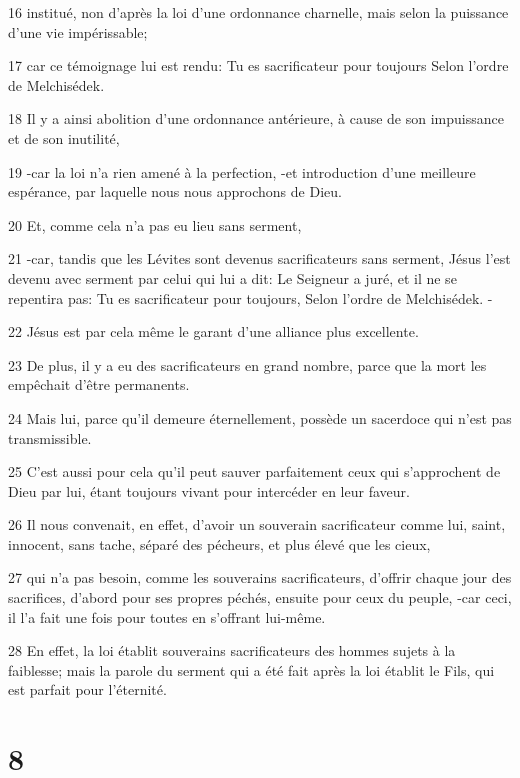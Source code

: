 \par 16 institué, non d'après la loi d'une ordonnance charnelle, mais selon la puissance d'une vie impérissable;
\par 17 car ce témoignage lui est rendu: Tu es sacrificateur pour toujours Selon l'ordre de Melchisédek.
\par 18 Il y a ainsi abolition d'une ordonnance antérieure, à cause de son impuissance et de son inutilité,
\par 19 -car la loi n'a rien amené à la perfection, -et introduction d'une meilleure espérance, par laquelle nous nous approchons de Dieu.
\par 20 Et, comme cela n'a pas eu lieu sans serment,
\par 21 -car, tandis que les Lévites sont devenus sacrificateurs sans serment, Jésus l'est devenu avec serment par celui qui lui a dit: Le Seigneur a juré, et il ne se repentira pas: Tu es sacrificateur pour toujours, Selon l'ordre de Melchisédek. -
\par 22 Jésus est par cela même le garant d'une alliance plus excellente.
\par 23 De plus, il y a eu des sacrificateurs en grand nombre, parce que la mort les empêchait d'être permanents.
\par 24 Mais lui, parce qu'il demeure éternellement, possède un sacerdoce qui n'est pas transmissible.
\par 25 C'est aussi pour cela qu'il peut sauver parfaitement ceux qui s'approchent de Dieu par lui, étant toujours vivant pour intercéder en leur faveur.
\par 26 Il nous convenait, en effet, d'avoir un souverain sacrificateur comme lui, saint, innocent, sans tache, séparé des pécheurs, et plus élevé que les cieux,
\par 27 qui n'a pas besoin, comme les souverains sacrificateurs, d'offrir chaque jour des sacrifices, d'abord pour ses propres péchés, ensuite pour ceux du peuple, -car ceci, il l'a fait une fois pour toutes en s'offrant lui-même.
\par 28 En effet, la loi établit souverains sacrificateurs des hommes sujets à la faiblesse; mais la parole du serment qui a été fait après la loi établit le Fils, qui est parfait pour l'éternité.

\chapter{8}

